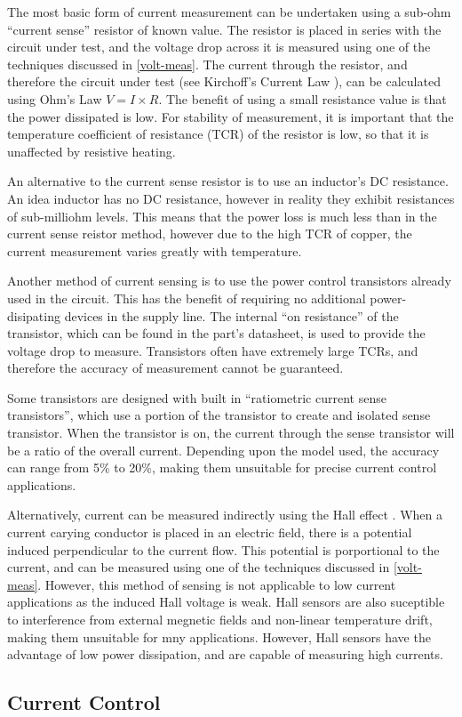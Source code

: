 The most basic form of current measurement can be undertaken using a sub-ohm ``current sense'' resistor of known value. The resistor is placed in series with the circuit under test, and the voltage drop across it is measured using one of the techniques discussed in \ref{volt-meas}. The current through the resistor, and therefore the circuit under test (see Kirchoff's Current Law \cite{kirchoff}), can be calculated using Ohm's Law \cite{ohm} $V = I \times R$. The benefit of using a small resistance value is that the power dissipated is low. For stability of measurement, it is important that the temperature coefficient of resistance (TCR) of the resistor is low, so that it is unaffected by resistive heating. 

An alternative to the current sense resistor is to use an inductor's DC resistance. An idea inductor has no DC resistance, however in reality they exhibit resistances of sub-milliohm levels. This means that the power loss is much less than in the current sense reistor method, however due to the high TCR of copper, the current measurement varies greatly with temperature.

Another method of current sensing is to use the power control transistors already used in the circuit. This has the benefit of requiring no additional power-disipating devices in the supply line. The internal ``on resistance'' of the transistor, which can be found in the part's datasheet, is used to provide the voltage drop to measure. Transistors often have extremely large TCRs, and therefore the accuracy of measurement cannot be guaranteed. 

Some transistors are designed with built in ``ratiometric current sense transistors'', which use a portion of the transistor to create and isolated sense transistor. When the transistor is on, the current through the sense transistor will be a ratio of the overall current. Depending upon the model used, the accuracy can range from 5\% to 20\%, making them unsuitable for precise current control applications.

Alternatively, current can be measured indirectly using the Hall effect \cite{hall}. When a current carying conductor is placed in an electric field, there is a potential induced perpendicular to the current flow. This potential is porportional to the current, and can be measured using one of the techniques discussed in \ref{volt-meas}. However, this method of sensing is not applicable to low current applications as the induced Hall voltage is weak. Hall sensors are also suceptible to interference from external megnetic fields and non-linear temperature drift, making them unsuitable for mny applications. However, Hall sensors have the advantage of low power dissipation, and are capable of measuring high currents.

\subsection{Current Control}